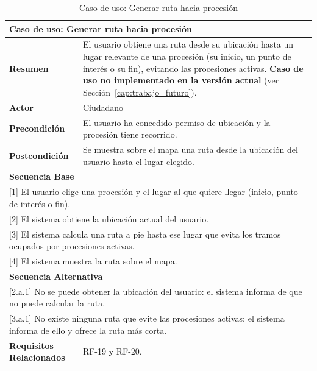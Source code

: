 \begin{table}[h!]
    \centering
    \renewcommand{\arraystretch}{1.5}

    \begin{tabular}{|p{4cm}|p{11cm}|}
        \hline
        \multicolumn{2}{|l|}{\textbf{Caso de uso: Generar ruta hacia procesión}} \\
        \hline
        \textbf{Resumen} & El usuario obtiene una ruta desde su ubicación hasta un lugar relevante de una procesión (su inicio, un punto de interés o su fin), evitando las procesiones activas. \textbf{Caso de uso no implementado en la versión actual} (ver Sección~\ref{cap:trabajo_futuro}). \\
        \hline
        \textbf{Actor} & Ciudadano \\
        \hline
        \textbf{Precondición} & El usuario ha concedido permiso de ubicación y la procesión tiene recorrido. \\
        \hline
        \textbf{Postcondición} & Se muestra sobre el mapa una ruta desde la ubicación del usuario hasta el lugar elegido. \\
        \hline
        \multicolumn{2}{|l|}{\textbf{Secuencia Base}} \\
        \hline
        \multicolumn{2}{|p{15cm}|}{ [1] El usuario elige una procesión y el lugar al que quiere llegar (inicio, punto de interés o fin). } \\
        \hline
        \multicolumn{2}{|p{15cm}|}{ [2] El sistema obtiene la ubicación actual del usuario. } \\
        \hline
        \multicolumn{2}{|p{15cm}|}{ [3] El sistema calcula una ruta a pie hasta ese lugar que evita los tramos ocupados por procesiones activas. } \\
        \hline
        \multicolumn{2}{|p{15cm}|}{ [4] El sistema muestra la ruta sobre el mapa. } \\
        \hline
        \multicolumn{2}{|l|}{\textbf{Secuencia Alternativa}} \\
        \hline
        \multicolumn{2}{|p{15cm}|}{ [2.a.1] No se puede obtener la ubicación del usuario: el sistema informa de que no puede calcular la ruta. } \\
        \hline
        \multicolumn{2}{|p{15cm}|}{ [3.a.1] No existe ninguna ruta que evite las procesiones activas: el sistema informa de ello y ofrece la ruta más corta. } \\
        \hline
        \textbf{Requisitos Relacionados} & RF-19 y RF-20. \\
        \hline
    \end{tabular}
    \caption{Caso de uso: Generar ruta hacia procesión}
\end{table}
